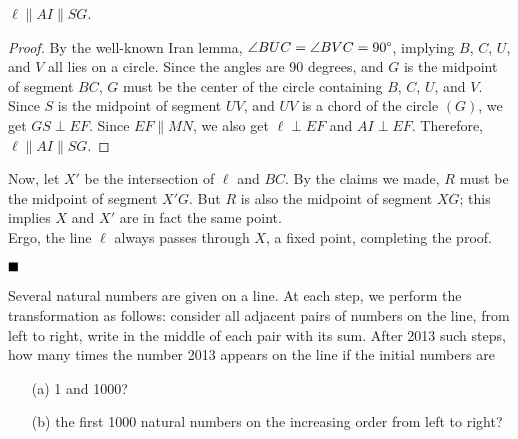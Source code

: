 \documentclass[11pt]{article}
\newenvironment{solution}[1][Solution]{%
  \proof[\normalfont \faPenNib \hspace{0.2cm} \ttfamily \scshape \large #1]%
}{\(\hfill \blacksquare\){\parfillskip0pt\par}}
\theoremstyle{definition}
\begin{document}
\begin{solution}
\begin{enumerate}
                \begin{claim}
                    \(\ell \parallel AI \parallel SG\).
                \end{claim}

                \begin{proof}
                    By the well-known Iran lemma, \(\angle BUC = \angle BVC = 90 \degree\), implying \(B\), \(C\), \(U\), and \(V\) all lies on a circle. Since the angles are 90 degrees, and \(G\) is the midpoint of segment \(BC\), \(G\) must be the center of the circle containing \(B\), \(C\), \(U\), and \(V\). Since \(S\) is the midpoint of segment \(UV\), and \(UV\) is a chord of the circle \((G)\), we get \(GS \perp EF\). Since \(EF \parallel MN\), we also get \(\ell \perp EF\) and \(AI \perp EF\). Therefore, \(\ell \parallel AI \parallel SG\).
                \end{proof}

                Now, let \(X'\) be the intersection of \(\ell\) and \(BC\). By the claims we made, \(R\) must be the midpoint of segment \(X'G\). But \(R\) is also the midpoint of segment \(XG\); this implies \(X\) and \(X'\) are in fact the same point.\\
                Ergo, the line \(\ell\) always passes through \(X\), a fixed point, completing the proof.
            \end{enumerate}
        \end{solution}

        \newpage

        \begin{problem}
            Several natural numbers are given on a line. At each step, we perform the transformation as follows: consider all adjacent pairs of numbers on the line, from left to right, write in the middle of each pair with its sum. After 2013 such steps, how many times the number 2013 appears on the line if the initial numbers are
            \begin{enumerate}
                \item[(a)] 1 and 1000?
                \item[(b)] the first 1000 natural numbers on the increasing order from left to right?
            \end{enumerate}
        \end{problem}
\end{document}
